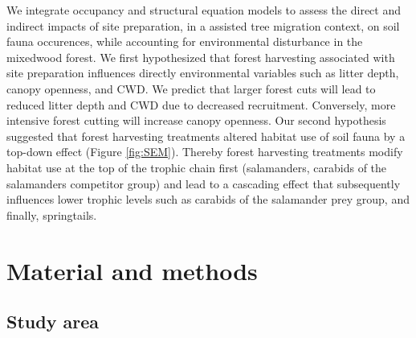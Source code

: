 We integrate occupancy and structural equation models to assess the direct and indirect impacts of site preparation, in a assisted tree migration context, 
on soil fauna occurences, while accounting for environmental disturbance in the mixedwood forest.
We first hypothesized that forest harvesting associated with site preparation influences directly environmental variables such as litter depth, canopy openness, and CWD. 
We predict that larger forest cuts will lead to reduced litter depth and CWD due to decreased recruitment. 
Conversely, more intensive forest cutting will increase canopy openness. 
Our second hypothesis suggested that forest harvesting treatments altered habitat use of soil fauna by a top-down effect (Figure \ref*{fig:SEM}). 
Thereby forest harvesting treatments modify habitat use at the top of the trophic chain first (salamanders, carabids of the salamanders competitor group) and lead to 
a cascading effect that subsequently influences lower trophic levels such as carabids of the salamander prey group, and finally, springtails.



\section*{Material and methods}
\label{sec:matmet1}

\subsection*{Study area}
\label{subsec:area}

